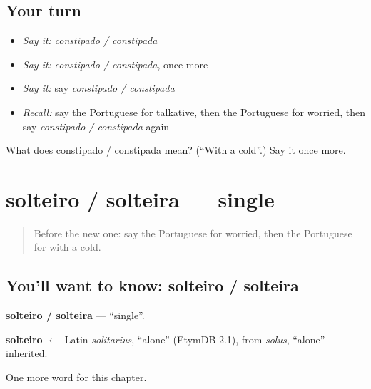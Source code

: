 \subsection*{Your turn}
\begin{itemize}
\raggedright
  \item \emph{Say it:} \emph{constipado / constipada}
  \item \emph{Say it:} \emph{constipado / constipada}, once more
  \item \emph{Say it:} say \emph{constipado / constipada}
  \item \emph{Recall:} say the Portuguese for talkative, then the Portuguese for worried, then say \emph{constipado / constipada} again
\end{itemize}

\begin{tcolorbox}[breakable,colback=teal!4,colframe=teal!35!black,title={Before you move on}]
What does constipado / constipada mean? (\textquotedblleft{}With a cold\textquotedblright{}.) Say it once more.
\end{tcolorbox}
\section[solteiro / solteira]{solteiro / solteira — single}

\label{lesson:PT-C187-solteiro-solteira}



\begin{quote}
Before the new one: say the Portuguese for worried, then the Portuguese for with a cold.
\end{quote}

\subsection*{You'll want to know: solteiro / solteira}
\textbf{solteiro / solteira} — \textquotedblleft{}single\textquotedblright{}.

\begin{cousinweb}
\textbf{solteiro} $\leftarrow$ Latin \emph{solitarius}, \textquotedblleft{}alone\textquotedblright{} (EtymDB 2.1), from \emph{solus}, \textquotedblleft{}alone\textquotedblright{} — inherited.
\end{cousinweb}

\begin{grammarlens}[title={What you've built}]
One more word for this chapter.
\end{grammarlens}

